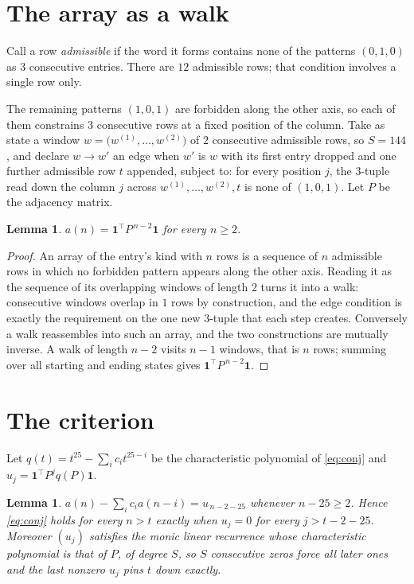 \documentclass[11pt,a4paper]{article}
\theoremstyle{plain}
\newtheorem{lemma}[theorem]{Lemma}
\theoremstyle{definition}
\begin{document}
\section{The array as a walk}

Call a row \emph{admissible} if the word it forms contains none of the patterns
$(0,1,0)$ as $3$ consecutive entries. There are $12$ admissible rows; that condition
involves a single row only.

The remaining patterns $(1,0,1)$ are forbidden along the other axis, so each of them
constrains $3$ consecutive rows at a fixed position of the column. Take as state a
window $w=\bigl(w^{(1)},\dots,w^{(2)}\bigr)$ of $2$ consecutive admissible
rows, so $S=144$, and declare $w\to w'$ an edge when $w'$ is $w$ with its first entry
dropped and one further admissible row $t$ appended, subject to: for every position
$j$, the $3$-tuple read down the column $j$ across $w^{(1)},\dots,w^{(2)},t$
is none of $(1,0,1)$. Let $P$ be the adjacency matrix.

\begin{lemma}\label{lem:walk}
$a(n)=\mathbf{1}^{\!\top}P^{\,n-2}\mathbf{1}$ for every $n\ge2$.
\end{lemma}

\begin{proof}
An array of the entry's kind with $n$ rows is a sequence of $n$ admissible rows in
which no forbidden pattern appears along the other axis. Reading it as the sequence of its
overlapping windows of length $2$ turns it into a walk: consecutive windows overlap in
$1$ rows by construction, and the edge condition is exactly the requirement on the one
new $3$-tuple that each step creates. Conversely a walk reassembles into such an array,
and the two constructions are mutually inverse. A walk of length $n-2$ visits $n-1$
windows, that is $n$ rows; summing over all starting and ending states gives
$\mathbf{1}^{\!\top}P^{\,n-2}\mathbf{1}$.
\end{proof}

\section{The criterion}

Let $q(t)=t^{25}-\sum_i c_i t^{25-i}$ be the characteristic polynomial of
\eqref{eq:conj} and $u_j=\mathbf{1}^{\!\top}P^{j}q(P)\mathbf{1}$.

\begin{lemma}\label{lem:crit}
$a(n)-\sum_i c_i a(n-i)=u_{\,n-2-25}$ whenever $n-25\ge2$. Hence
\eqref{eq:conj} holds for every $n>t$ exactly when $u_j=0$ for every
$j>t-2-25$. Moreover $(u_j)$ satisfies the monic linear recurrence whose
characteristic polynomial is that of $P$, of degree $S$, so $S$ consecutive zeros force all
later ones and the last nonzero $u_j$ pins $t$ down exactly.
\end{lemma}
\end{document}
